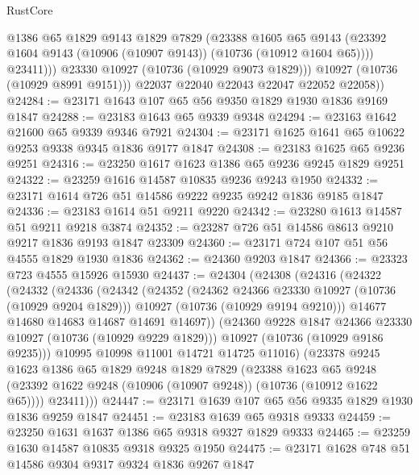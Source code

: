 \begin{lexlean}{RustCore}
\begin{coremodule}
                  @1386
                  @65
                  @1829
                  @9143
                  @1829
                  @7829
                  (@23388
                    @1605
                    @65
                    @9143
                    (@23392 @1604 @9143 (@10906 (@10907 @9143)) (@10736 (@10912 @1604 @65))))
                  @23411)))
            @23330
            @10927
            (@10736 (@10929 @9073 @1829)))
          @10927
          (@10736 (@10929 @8991 @9151)))
        @22037
        @22040
        @22043
        @22047
        @22052
        @22058))
@24284 := @23171 @1643 @107 @65 @56 @9350 @1829 @1930 @1836 @9169 @1847
@24288 := @23183 @1643 @65 @9339 @9348
@24294 := @23163 @1642 @21600 @65 @9339 @9346 @7921
@24304 := @23171 @1625 @1641 @65 @10622 @9253 @9338 @9345 @1836 @9177 @1847
@24308 := @23183 @1625 @65 @9236 @9251
@24316 := @23250 @1617 @1623 @1386 @65 @9236 @9245 @1829 @9251
@24322 := @23259 @1616 @14587 @10835 @9236 @9243 @1950
@24332 := @23171 @1614 @726 @51 @14586 @9222 @9235 @9242 @1836 @9185 @1847
@24336 := @23183 @1614 @51 @9211 @9220
@24342 := @23280 @1613 @14587 @51 @9211 @9218 @3874
@24352 := @23287 @726 @51 @14586 @8613 @9210 @9217 @1836 @9193 @1847 @23309
@24360 := @23171 @724 @107 @51 @56 @4555 @1829 @1930 @1836
@24362 := @24360 @9203 @1847
@24366 := @23323 @723 @4555 @15926 @15930
@24437 := @24304
    (@24308
      (@24316
        (@24322
          (@24332
            (@24336
              (@24342
                (@24352
                  (@24362 @24366 @23330 @10927 (@10736 (@10929 @9204 @1829)))
                  @10927
                  (@10736 (@10929 @9194 @9210)))
                @14677
                @14680
                @14683
                @14687
                @14691
                @14697))
            (@24360 @9228 @1847 @24366 @23330 @10927 (@10736 (@10929 @9229 @1829)))
            @10927
            (@10736 (@10929 @9186 @9235)))
          @10995
          @10998
          @11001
          @14721
          @14725
          @11016)
        (@23378
          @9245
          @1623
          @1386
          @65
          @1829
          @9248
          @1829
          @7829
          (@23388
            @1623
            @65
            @9248
            (@23392 @1622 @9248 (@10906 (@10907 @9248)) (@10736 (@10912 @1622 @65))))
          @23411)))
@24447 := @23171 @1639 @107 @65 @56 @9335 @1829 @1930 @1836 @9259 @1847
@24451 := @23183 @1639 @65 @9318 @9333
@24459 := @23250 @1631 @1637 @1386 @65 @9318 @9327 @1829 @9333
@24465 := @23259 @1630 @14587 @10835 @9318 @9325 @1950
@24475 := @23171 @1628 @748 @51 @14586 @9304 @9317 @9324 @1836 @9267 @1847

\end{coremodule}
\end{lexlean}
